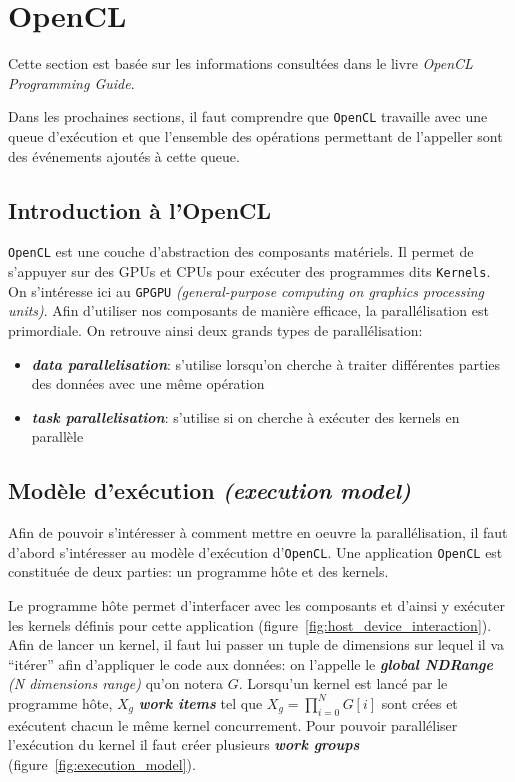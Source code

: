 \section{OpenCL}

Cette section est basée sur les informations consultées dans le livre 
\textit{OpenCL Programming Guide}\autocite{openclguide}. 

Dans les prochaines sections, il faut comprendre que \texttt{OpenCL} travaille 
avec une queue d'exécution et que l'ensemble des opérations permettant de l'appeller 
sont des événements ajoutés à cette queue.

\subsection{Introduction à l'OpenCL}

\texttt{OpenCL} est une couche d'abstraction des composants matériels. 
Il permet de s'appuyer sur des GPUs et CPUs pour exécuter des programmes dits 
\texttt{Kernels}. On s'intéresse ici au \texttt{GPGPU} 
\textit{(general-purpose computing on graphics processing units)}. Afin d'utiliser 
nos composants de manière efficace, la parallélisation est primordiale. On retrouve 
ainsi deux grands types de parallélisation:
\begin{itemize}
    \item \textbf{\textit{data parallelisation}}: s'utilise lorsqu'on cherche à traiter
        différentes parties des données avec une même opération
    \item \textbf{\textit{task parallelisation}}: s'utilise si on cherche à exécuter des 
        kernels en parallèle
\end{itemize}

\subsection{Modèle d'exécution \textit{(execution model)}}

Afin de pouvoir s'intéresser à comment mettre en oeuvre la parallélisation, il faut 
d'abord s'intéresser au modèle d'exécution d'\texttt{OpenCL}. Une application 
\texttt{OpenCL} est constituée de deux parties: un programme hôte et des kernels.

Le programme hôte permet d'interfacer avec les composants et d'ainsi y exécuter 
les kernels définis pour cette application (figure~\ref{fig:host_device_interaction}).
Afin de lancer un kernel, il faut lui passer un tuple de dimensions sur lequel il va 
``itérer'' afin d'appliquer le code aux données: on l'appelle le 
\textbf{\textit{global NDRange}} \textit{(N dimensions range)} qu'on notera $G$.
Lorsqu'un kernel est lancé par le programme hôte, $X_g$ \textbf{\textit{work items}} tel que 
${\displaystyle X_g = \prod_{i=0}^{N}G[i]}$ sont crées et exécutent chacun le même
kernel concurrement. Pour pouvoir paralléliser l'exécution du kernel il faut 
créer plusieurs \textbf{\textit{work groups}} (figure~\ref{fig:execution_model}).

